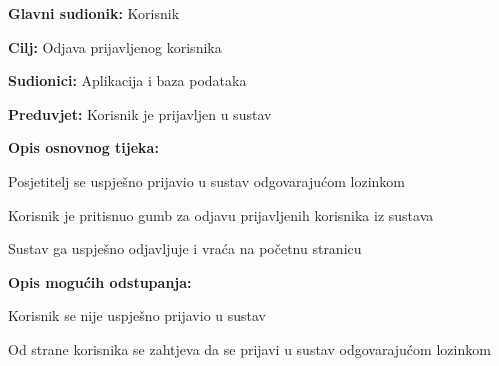 					\noindent {}
					\begin{packed_item}
						
						\item \textbf{Glavni sudionik: }Korisnik
						\item  \textbf{Cilj:} Odjava prijavljenog korisnika
						\item  \textbf{Sudionici:} Aplikacija i baza podataka
						\item  \textbf{Preduvjet:} Korisnik je prijavljen u sustav
						\item  \textbf{Opis osnovnog tijeka:}
						
						\item[] \begin{packed_enum}
							
							\item Posjetitelj se uspješno prijavio u sustav odgovarajućom lozinkom
							\item Korisnik je pritisnuo gumb za odjavu prijavljenih korisnika iz sustava 
							\item Sustav ga uspješno odjavljuje i vraća na početnu stranicu
							
						\end{packed_enum}
						
						\item  \textbf{Opis mogućih odstupanja:}
						
						\item[] \begin{packed_item}
							
							\item[1.a] Korisnik se nije uspješno prijavio u sustav
							\item[] \begin{packed_enum}
								
								\item Od strane korisnika se zahtjeva da se prijavi u sustav odgovarajućom lozinkom
								
							\end{packed_enum}
							
							
						\end{packed_item}
					\end{packed_item}
					
